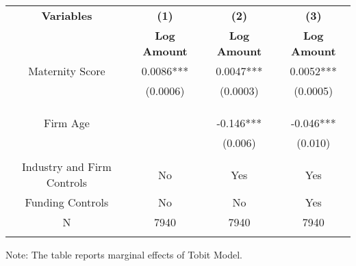  \begin{table}[htbp]
    \begin{tabular}{c c c c }
    \toprule
    \textbf{Variables} & \textbf{(1)} & \textbf{(2)} & \textbf{(3)}             \\ 
    \textbf & \textbf{Log Amount} & \textbf{Log Amount} & \textbf{Log Amount}   \\ 

    \midrule
    Maternity Score     &   0.0086*** &      0.0047*** &     0.0052***   \\
                        &  (0.0006)  &      (0.0003)   &       (0.0005)  \\
                        &             &                &                \\

                        &             &                &               \\
                        &             &                &                \\
    Firm Age            &             &      -0.146*** &      -0.046***    \\
                        &             &      (0.006)   &      (0.010)       \\
                        &             &                &                    \\
   Industry and Firm Controls   &   No        &   Yes       &        Yes    \\
    Funding Controls    &   No             &   No        &     Yes        \\

    \midrule
     N                  &   7940          &      7940  &      7940      \\          
    \bottomrule
    \addlinespace[1ex]
    \multicolumn{3}{l}{\textsuperscript{***}$p<0.01$, 
      \textsuperscript{**}$p<0.05$, 
      \textsuperscript{*}$p<0.1$}
    \end{tabular}
    Note: The table reports marginal effects of Tobit Model.
\end{table}
